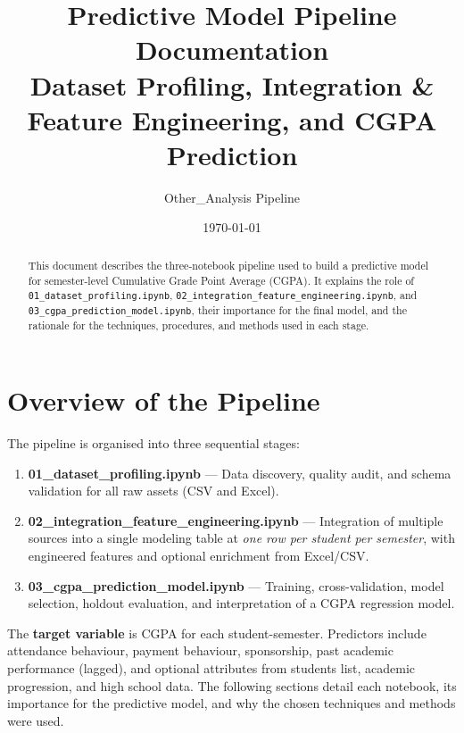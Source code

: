 \documentclass[12pt,a4paper]{article}
\title{Predictive Model Pipeline Documentation\\[0.5em]
\large Dataset Profiling, Integration \& Feature Engineering, and CGPA Prediction}
\author{Other\_Analysis Pipeline}
\date{\today}
\begin{document}
\maketitle

\begin{abstract}
This document describes the three-notebook pipeline used to build a predictive model for semester-level Cumulative Grade Point Average (CGPA). It explains the role of \texttt{01\_dataset\_profiling.ipynb}, \texttt{02\_integration\_feature\_engineering.ipynb}, and \texttt{03\_cgpa\_prediction\_model.ipynb}, their importance for the final model, and the rationale for the techniques, procedures, and methods used in each stage.
\end{abstract}

\tableofcontents
\newpage

\section{Overview of the Pipeline}

The pipeline is organised into three sequential stages:

\begin{enumerate}[leftmargin=*]
  \item \textbf{01\_dataset\_profiling.ipynb} --- Data discovery, quality audit, and schema validation for all raw assets (CSV and Excel).
  \item \textbf{02\_integration\_feature\_engineering.ipynb} --- Integration of multiple sources into a single modeling table at \emph{one row per student per semester}, with engineered features and optional enrichment from Excel/CSV.
  \item \textbf{03\_cgpa\_prediction\_model.ipynb} --- Training, cross-validation, model selection, holdout evaluation, and interpretation of a CGPA regression model.
\end{enumerate}

The \textbf{target variable} is CGPA for each student-semester. Predictors include attendance behaviour, payment behaviour, sponsorship, past academic performance (lagged), and optional attributes from students list, academic progression, and high school data. The following sections detail each notebook, its importance for the predictive model, and why the chosen techniques and methods were used.
\end{document}
